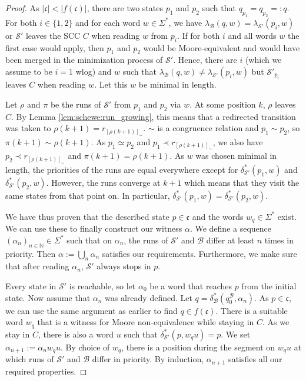 \begin{proof}
	As $|\mathfrak{c}| < |f(\mathfrak{c})|$, there are two states $p_1$ and $p_2$ such that $q_{p_1} = q_{p_2} =: q$. For both $i \in \{1,2\}$ and for each word $w \in \Sigma^*$, we have $\lambda_\mathcal{B}(q, w) = \lambda_{\mathcal{S}'}(p_i, w)$ or $\mathcal{S}'$ leaves the SCC $C$ when reading $w$ from $p_i$. If for both $i$ and all words $w$ the first case would apply, then $p_1$ and $p_2$ would be Moore-equivalent and would have been merged in the minimization process of $\mathcal{S}'$. Hence, there are $i$ (which we assume to be $i=1$ wlog) and $w$ such that $\lambda_\mathcal{B}(q, w) \neq \lambda_{\mathcal{S}'}(p_i, w)$ but $\mathcal{S}'_{p_i}$ leaves $C$ when reading $w$. Let this $w$ be minimal in length.
	
	Let $\rho$ and $\pi$ be the runs of $\mathcal{S}'$ from $p_1$ and $p_2$ via $w$. At some position $k$, $\rho$ leaves $C$. By Lemma \ref{lem:schewe:run_growing}, this means that a redirected transition was taken to $\rho(k+1) = r_{[\rho(k+1)]_\sim}$. $\sim$ is a congruence relation and $p_1 \sim p_2$, so $\pi(k+1) \sim \rho(k+1)$. As $p_1 \simeq p_2$ and $p_1 \prec r_{[\rho(k+1)]_\sim}$, we also have $p_2 \prec r_{[\rho(k+1)]_\sim}$ and $\pi(k+1) = \rho(k+1)$. As $w$ was chosen minimal in length, the priorities of the runs are equal everywhere except for $\delta^*_{\mathcal{S}'}(p_1, w)$ and $\delta^*_{\mathcal{S}'}(p_2, w)$. However, the runs converge at $k+1$ which means that they visit the same states from that point on. In particular, $\delta^*_{\mathcal{S}'}(p_1, w) = \delta^*_{\mathcal{S}'}(p_2, w)$.
	
	We have thus proven that the described state $p \in \mathfrak{c}$ and the words $w_q \in \Sigma^*$ exist. We can use these to finally construct our witness $\alpha$. We define a sequence $(\alpha_n)_{n \in \mathbb{N}} \in \Sigma^*$ such that on $\alpha_n$, the runs of $\mathcal{S}'$ and $\mathcal{B}$ differ at least $n$ times in priority. Then $\alpha := \bigcup_n \alpha_n$ satisfies our requirements. Furthermore, we make sure that after reading $\alpha_n$, $\mathcal{S}'$ always stops in $p$.
	
	Every state in $\mathcal{S}'$ is reachable, so let $\alpha_0$ be a word that reaches $p$ from the initial state. Now assume that $\alpha_n$ was already defined. Let $q = \delta^*_\mathcal{B}(q_0^\mathcal{B}, \alpha_n)$. As $p \in \mathfrak{c}$, we can use the same argument as earlier to find $q \in f(\mathfrak{c})$. There is a suitable word $w_q$ that is a witness for Moore non-equivalence while staying in $C$. As we stay in $C$, there is also a word $u$ such that $\delta^*_{\mathcal{S}'}(p, w_q u) = p$. We set $\alpha_{n+1} := \alpha_n w_q u$. By choice of $w_q$, there is a position during the segment on $w_q u$ at which runs of $\mathcal{S}'$ and $\mathcal{B}$ differ in priority. By induction, $\alpha_{n+1}$ satisfies all our required properties.
\end{proof}





